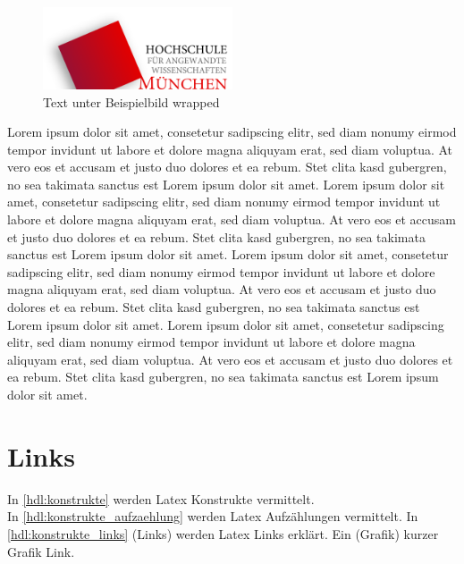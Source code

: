 \begin{figure}
  \begin{center}
    \includegraphics[width=0.5\textwidth]{figures/hm_logo_svg.pdf}
  \end{center}
  \caption[Kurzeintrag Verzeichnis Beispielbild wrapped]{Text unter Beispielbild wrapped} \label{fig:beispielbild_wrapped} 
\end{figure}
Lorem ipsum dolor sit amet, consetetur sadipscing elitr, sed diam nonumy eirmod tempor invidunt ut labore et dolore magna aliquyam erat, sed diam voluptua. At vero eos et accusam et justo duo dolores et ea rebum. Stet clita kasd gubergren, no sea takimata sanctus est Lorem ipsum dolor sit amet. Lorem ipsum dolor sit amet, consetetur sadipscing elitr, sed diam nonumy eirmod tempor invidunt ut labore et dolore magna aliquyam erat, sed diam voluptua. At vero eos et accusam et justo duo dolores et ea rebum. Stet clita kasd gubergren, no sea takimata sanctus est Lorem ipsum dolor sit amet.
Lorem ipsum dolor sit amet, consetetur sadipscing elitr, sed diam nonumy eirmod tempor invidunt ut labore et dolore magna aliquyam erat, sed diam voluptua. At vero eos et accusam et justo duo dolores et ea rebum. Stet clita kasd gubergren, no sea takimata sanctus est Lorem ipsum dolor sit amet. Lorem ipsum dolor sit amet, consetetur sadipscing elitr, sed diam nonumy eirmod tempor invidunt ut labore et dolore magna aliquyam erat, sed diam voluptua. At vero eos et accusam et justo duo dolores et ea rebum. Stet clita kasd gubergren, no sea takimata sanctus est Lorem ipsum dolor sit amet.
\clearpage

\section{Links} \label{hdl:konstrukte_links}
In \ref{hdl:konstrukte} werden Latex Konstrukte vermittelt.\\
In \autoref{hdl:konstrukte_aufzaehlung} werden Latex Aufzählungen vermittelt.
\newline
In \autoref{hdl:konstrukte_links} (Links) werden Latex Links erklärt.
\newline
Ein  (Grafik) kurzer Grafik Link.
\clearpage


